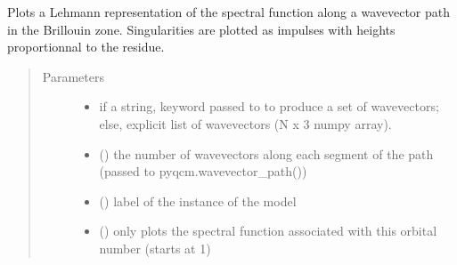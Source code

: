 \documentclass[letterpaper,10pt,english]{sphinxmanual}
\begin{document}
\begin{fulllineitems}
\label{\detokenize{spectral:pyqcm.spectral.spectral_function_Lehmann}}
\sphinxAtStartPar
Plots a Lehmann representation of the spectral function along a wavevector path in the Brillouin zone. Singularities are plotted as impulses with heights proportionnal to the residue.
\begin{quote}\begin{description}
\item[{Parameters}] \leavevmode\begin{itemize}
\item {} 
\sphinxAtStartPar
{} \textendash{} if a string, keyword passed to  to produce a set of wavevectors; else, explicit list of wavevectors (N x 3 numpy array).

\item {} 
\sphinxAtStartPar
{} () \textendash{} the number of wavevectors along each segment of the path (passed to pyqcm.wavevector\_path())

\item {} 
\sphinxAtStartPar
{} () \textendash{} label of the instance of the model

\item {} 
\sphinxAtStartPar
{} () \textendash{} only plots the spectral function associated with this orbital number (starts at 1)


\end{itemize}
\end{description}
\end{quote}
\end{fulllineitems}
\end{document}
